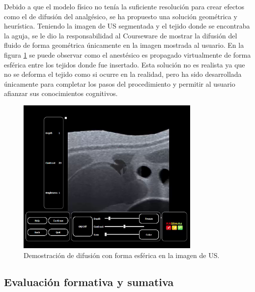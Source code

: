 
Debido a que el modelo físico no tenía la suficiente resolución para crear efectos como el de difusión del analgésico, se ha propuesto una solución geométrica y heurística. Teniendo la imagen de \ac{US} segmentada y el tejido donde se encontraba la aguja, se le dio la responsabilidad al \ac{Courseware} de mostrar la difusión del fluido de forma geométrica únicamente en la imagen mostrada al usuario. En la figura \ref{fig:spread2} se puede observar como el anestésico es propagado virtualmente de forma esférica entre los tejidos donde fue insertado. Esta solución no es realista ya que no se deforma el tejido como si ocurre en la realidad, pero ha sido desarrollada únicamente para completar los pasos del procedimiento y permitir al usuario afianzar sus conocimientos cognitivos.

\begin{figure}[ht]
    \centering
    \includegraphics[width=0.8\textwidth]{IMG/difussion.png}
    \caption{Demostración de difusión con forma esférica en la imagen de \acs{US}.}
    \label{fig:spread2}
\end{figure}

 



\subsection{Evaluación formativa y sumativa}
\label{course:feedback}

